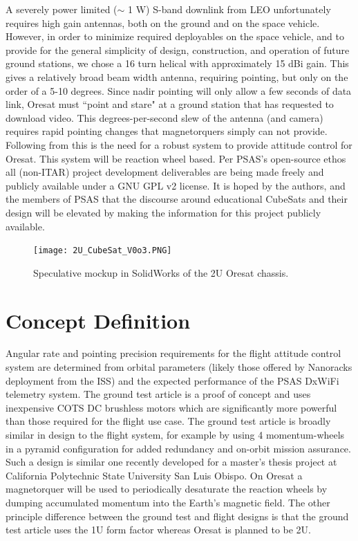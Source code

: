 \documentclass[]{aiaa-tc}%
\begin{document}
A severely power limited ($\sim$ 1 W) S-band downlink from LEO unfortunately requires high gain antennas, both on the ground and on the space vehicle. However, in order to minimize required deployables on the space vehicle, and to provide for the general simplicity of design, construction, and operation of future ground stations, we chose a 16 turn helical with approximately 15 dBi gain. This gives a relatively broad beam width antenna, requiring pointing, but only on the order of a 5-10 degrees. Since nadir pointing will only allow a few seconds of data link, Oresat must ``point and stare" at a ground station that has requested to download video. This degrees-per-second slew of the antenna (and camera) requires rapid pointing changes that magnetorquers simply can not provide. Following from this is the need for a robust system to provide attitude control for Oresat. This system will be reaction wheel based. Per PSAS’s open-source ethos all (non-ITAR) project development deliverables are being made freely and publicly available under a GNU GPL v2 license\cite{Oresat:15bk}. It is hoped by the authors, and the members of PSAS that the discourse around educational CubeSats and their design will be elevated by making the information for this project publicly available.

\begin{figure}[h!]
  \centering
  \texttt{[image: 2U\_CubeSat\_V0o3.PNG]}
  \caption{Speculative mockup in SolidWorks of the 2U Oresat chassis.}
  \label{fig:oresat}
\end{figure}

\section{Concept Definition}
	Angular rate and pointing precision requirements for the flight attitude control system are determined from orbital parameters (likely those offered by Nanoracks deployment from the ISS) and the expected performance of the PSAS DxWiFi telemetry system. The ground test article is a proof of concept and uses inexpensive COTS DC brushless motors which are significantly more powerful than those required for the flight use case. The ground test article is broadly similar in design to the flight system, for example by using 4 momentum-wheels in a pyramid configuration for added redundancy and on-orbit mission assurance. Such a design is similar one recently developed for a master's thesis project at California Polytechnic State University San Luis Obispo\cite{Logan:08bk}. On Oresat a magnetorquer will be used to periodically desaturate the reaction wheels by dumping accumulated momentum into the Earth's magnetic field. The other principle difference between the ground test and flight designs is that the ground test article uses the 1U form factor whereas Oresat is planned to be 2U.
\end{document}
